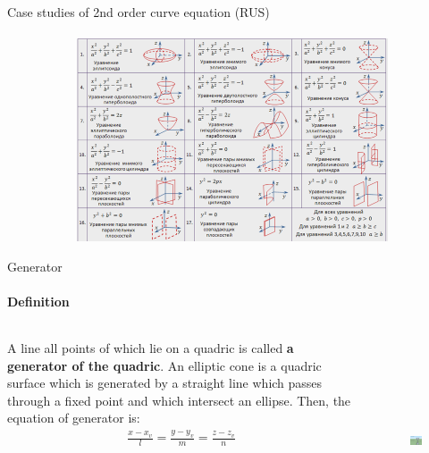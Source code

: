 \documentclass[aspectratio=169]{beamer}
\begin{document}
\begin{frame}[t]{Case studies of 2nd order curve equation (RUS)}
    \framesubtitle{}
        \vspace{-0.6cm}
        \begin{figure}[H]
            \centering\includegraphics[height=6cm,width=1\textwidth,keepaspectratio]{curve_eq_rus.png}
            \label{fig:curve_eq_rus.png}
        \end{figure}
    \end{frame}

\begin{frame}[t]{Generator}
\framesubtitle{Definition}
\begin{columns}[T,onlytextwidth]
    \begin{column}{0.49\textwidth}
        A line all points of which lie on a quadric is called \textbf{a generator of the quadric}. An elliptic cone is a quadric surface which is generated by a straight line which passes through a fixed point and which intersect an ellipse. Then, the equation of generator is:
\begin{align*}
    \frac{x-x_v}{l} = \frac{y-y_v}{m} = \frac{z-z_v}{n}
\end{align*}
    \end{column}
    \begin{column}{0.49\textwidth}
        \vspace{-0.6cm}
        \begin{figure}[H]
            \centering\includegraphics[height=6cm,width=1\textwidth,keepaspectratio]{generators.jpg}
            \label{fig:generators.jpg}
        \end{figure}
    \end{column}
\end{columns}

\end{frame}
\end{document}
